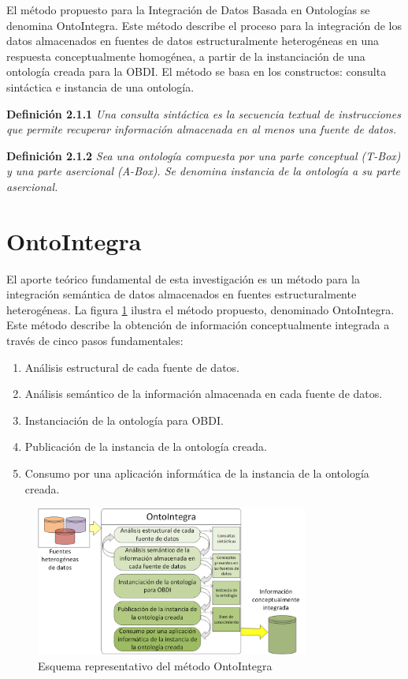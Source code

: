 El método propuesto para la Integración de Datos Basada en Ontologías se denomina OntoIntegra. Este método describe el proceso para la integración de los datos almacenados en fuentes de datos estructuralmente heterogéneas en una respuesta conceptualmente homogénea, a partir de la instanciación de una ontología creada para la OBDI. El método se basa en los constructos: consulta sintáctica e instancia de una ontología.

\textbf{Definición 2.1.1} \textit{Una consulta sintáctica es la secuencia textual de instrucciones que permite recuperar información almacenada en al menos una fuente de datos.}

\textbf{Definición 2.1.2} \textit{Sea una ontología compuesta por una parte conceptual (T-Box) y una parte asercional (A-Box). Se denomina instancia de la ontología a su parte asercional.}

\section{OntoIntegra}
El aporte teórico fundamental de esta investigación es un método para la integración semántica de datos almacenados en fuentes estructuralmente heterogéneas. La figura \ref{fig: metodoOntoIntegra} ilustra el método propuesto, denominado OntoIntegra. Este método describe la obtención de información conceptualmente integrada a través de cinco pasos fundamentales:

\begin{enumerate}
\item Análisis estructural de cada fuente de datos.
\item Análisis semántico de la información almacenada en cada fuente de datos.
\item Instanciación de la ontología para OBDI.
\item Publicación de la instancia de la ontología creada.
\item Consumo por una aplicación informática de la instancia de la ontología creada.
\end{enumerate}

\begin{figure}
\begin{center}
	\includegraphics[width=0.8\textwidth]{img/Metodo_OntoIntegra.png}
\end{center}
\caption{Esquema representativo del método OntoIntegra}
\label{fig: metodoOntoIntegra}
\end{figure}

